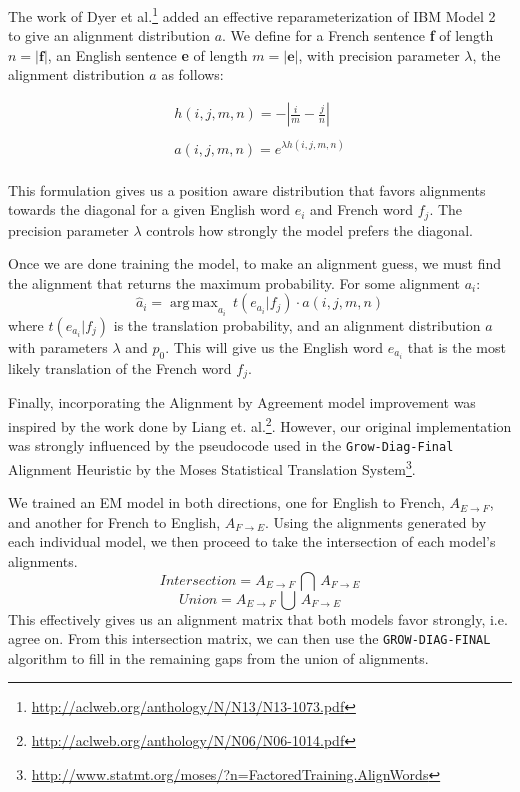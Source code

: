 \documentclass[twoside,twocolumn]{article}
\DeclareMathOperator*{\argmax}{arg\,max}
\begin{document}
The work of Dyer et al.\footnote{\url{http://aclweb.org/anthology/N/N13/N13-1073.pdf}} added an effective reparameterization of IBM Model 2 to give an alignment distribution $a$. We define for a French sentence \textbf{f} of length $n = |\textbf{f}|$, an English sentence \textbf{e} of length $m=|\textbf{e}|$, with precision parameter $\lambda$, the alignment distribution $a$ as follows:

\begin{equation}
\begin{split}
h(i,j,m,n) = - \left| \frac{i}{m} - \frac{j}{n}\right| \\
\\
a(i,j,m,n) =e^{  \lambda h(i,j,m,n)} \\
\end{split}
\end{equation}

This formulation gives us a position aware distribution that favors alignments towards the diagonal for a given English word $e_i$ and French word $f_j$. The precision parameter $\lambda$ controls how strongly the model prefers the diagonal.

Once we are done training the model, to make an alignment guess, we must find the alignment that returns the maximum probability. For some alignment $a_i$:
\begin{equation}
\hat{a}_i = \argmax_{a_i} \, t(e_{a_i}|f_j) \cdot a(i, j, m, n)
\end{equation}
where $t(e_{a_i}|f_j)$ is the translation probability, and an alignment distribution $a$ with parameters $\lambda$ and $p_0$. This will give us the English word $e_{a_i}$ that is the most likely translation of the French word $f_j$.

Finally, incorporating the Alignment by Agreement model improvement was inspired by the work done by Liang et. al.\footnote{\url{http://aclweb.org/anthology/N/N06/N06-1014.pdf}}. However, our original implementation was strongly influenced by the pseudocode used in the \texttt{Grow-Diag-Final} Alignment Heuristic by the Moses Statistical Translation System\footnote{\url{http://www.statmt.org/moses/?n=FactoredTraining.AlignWords}}. 

We trained an EM model in both directions, one for English to French, $A_{E \rightarrow F}$, and another for French to English, $A_{F \rightarrow E}$. Using the alignments generated by each individual model, we then proceed to take the intersection of each model's alignments. 
\begin{equation}
Intersection = A_{E \rightarrow F} \, \bigcap \, A_{F \rightarrow E}
\end{equation}
\begin{equation}
Union = A_{E \rightarrow F} \, \bigcup \, A_{F \rightarrow E}
\end{equation}
This effectively gives us an alignment matrix that both models favor strongly, i.e. agree on. From this intersection matrix, we can then use the \texttt{GROW-DIAG-FINAL} algorithm to fill in the remaining gaps from the union of alignments. 
\end{document}
